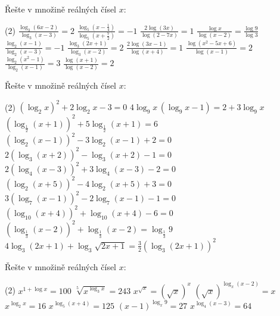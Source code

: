 \documentclass[12pt,a4paper]{article}
\begin{document}
\begin{exercise}
    Řešte v množině reálných čísel $x$:
    \begin{tasks}(2)
        \task $\displaystyle \frac{\log_3(6x-2)}{\log_3(x-3)} = 2$
        \task $\displaystyle \frac{\log_5\left(x - \frac{1}{4}\right)}{\log_5\left(x + \frac{7}{2}\right)} = -1$
        \task $\displaystyle \frac{2\log(3x)}{\log(2-7x)} = 1$
        \task $\displaystyle \frac{\log x}{\log(x-2)} = \frac{\log 9}{\log 3}$
        \task $\displaystyle \frac{\log_2(x-1)}{\log_2(x-3)} = -1$
        \task $\displaystyle \frac{\log_3(2x+1)}{\log_3(x-2)} = 2$
        \task $\displaystyle \frac{2\log(3x-1)}{\log(x+4)} = 1$
        \task $\displaystyle \frac{\log(x^2-5x+6)}{\log(x-1)} = 2$
        \task $\displaystyle \frac{\log_2(x^2-1)}{\log_2(x-1)} = 3$
        \task $\displaystyle \frac{\log(x+1)}{\log(x-2)} = 2$
    \end{tasks}
\end{exercise}


\begin{exercise}
    Řešte v množině reálných čísel $x$:
    \begin{tasks}(2)
        \task $\left(\log_{2} x\right)^{2} + 2\log_{2} x - 3 = 0$
        \task $4\log_{9} x \,(\log_{9} x - 1) = 2 + 3\log_{9} x$
        \task $\left(\log_{\frac12}(x+1)\right)^{2} + 5\log_{\frac12}(x+1) = 6$
        \task $\left(\log_{2}(x-1)\right)^{2} - 3\log_{2}(x-1) + 2 = 0$
        \task $2\left(\log_{3}(x+2)\right)^{2} - \log_{3}(x+2) - 1 = 0$
        \task $2\left(\log_{4}(x-3)\right)^{2} + 3\log_{4}(x-3) - 2 = 0$
        \task $\left(\log_{2}(x+5)\right)^{2} - 4\log_{2}(x+5) + 3 = 0$
        \task $3\left(\log_{7}(x-1)\right)^{2} - 2\log_{7}(x-1) - 1 = 0$
        \task $\left(\log_{10}(x+4)\right)^{2} + \log_{10}(x+4) - 6 = 0$        
        \task {}
        \task $\left(\log_{\frac13}(x-2)\right)^{2} + \log_{\frac13}(x-2) = \log_{\frac13} 9$
        \task $4\log_{3}(2x+1) + \log_{3}\sqrt{2x+1} = \frac{3}{2}\left(\log_{3}(2x+1)\right)^{2}$
    \end{tasks}
\end{exercise}


\begin{exercise}
    Řešte v množině reálných čísel $x$:
    \begin{tasks}(2)
        \task $x^{1+\log x} = 100$
        \task $\sqrt[5]{x^{\log_3 x}} = 243$
        \task $x^{\sqrt{x}} = (\sqrt{x})^{x}$
        \task $(\sqrt{x})^{\log_x (x-2)} = x$
        \task $x^{\log_2 x} = 16$
        \task $x^{\log_5 (x+4)} = 125$
        \task $(x-1)^{\log_x 9} = 27$
        \task $x^{\log_4 (x-3)} = 64$
    \end{tasks}
\end{exercise}
\end{document}
